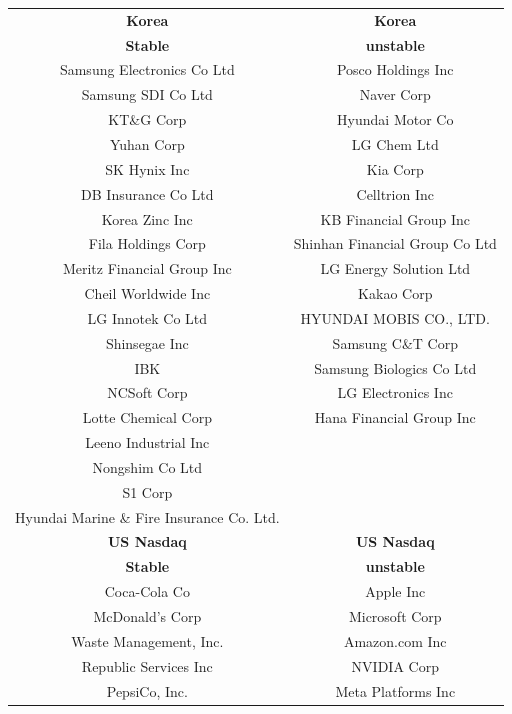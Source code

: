 \begin{table}[h]
	\label{tab:example}
	\tiny
	\centering
	\begin{tabular}{cc}
	\toprule\toprule
	\textbf{Korea} & \textbf{Korea} \\ 
	\textbf{Stable} & \textbf{unstable}  \\ 
	\midrule
	Samsung Electronics Co Ltd					&	Posco Holdings Inc				\\
	Samsung SDI Co Ltd							&	Naver Corp						\\
	KT\&G Corp									&	Hyundai Motor Co				\\
	Yuhan Corp									&	LG Chem Ltd						\\
	SK Hynix Inc								&	Kia Corp						\\
	DB Insurance Co Ltd							&	Celltrion Inc					\\
	Korea Zinc Inc								&	KB Financial Group Inc			\\
	Fila Holdings Corp							&	Shinhan Financial Group Co Ltd	\\
	Meritz Financial Group Inc					&	LG Energy Solution Ltd			\\
	Cheil Worldwide Inc							&	Kakao Corp						\\
	LG Innotek Co Ltd							&	HYUNDAI MOBIS CO., LTD.			\\
	Shinsegae Inc								&	Samsung C\&T Corp				\\
	IBK											&	Samsung Biologics Co Ltd		\\
	NCSoft Corp									&	LG Electronics Inc				\\
	Lotte Chemical Corp							&	Hana Financial Group Inc		\\
	Leeno Industrial Inc						&									\\
	Nongshim Co Ltd								&									\\
	S1 Corp										&									\\
	Hyundai Marine \& Fire Insurance Co. Ltd.	&									\\
	\midrule
	\textbf{US Nasdaq} & \textbf{US Nasdaq} \\ 
	\textbf{Stable} & \textbf{unstable} \\ 
	\midrule
	Coca-Cola Co					&	Apple Inc											\\
	McDonald's Corp					&	Microsoft Corp										\\
	Waste Management, Inc.			&	Amazon.com Inc										\\
	Republic Services Inc			&	NVIDIA Corp											\\
	PepsiCo, Inc.					&	Meta Platforms Inc									\\

\end{tabular}
\end{table}
